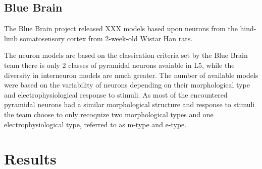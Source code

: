 \documentclass[altfont, fleqn]{uiophd}
\begin{document}
\section{Blue Brain}
The Blue Brain project released XXX models based upon neurons from 
the hind-limb somatosensory cortex
from 2-week-old Wistar Han rats.

The neuron models are based on the classication criteria set by the Blue Brain 
team there is only 2 classes of pyramidal neurons avaiable in L5, while
the diversity in interneuron models are much greater.
The number of available models were based on the variability of 
neurons depending on their morphological type and 
electrophysiological response to stimuli.
As most of the encountered pyramidal neurons had a similar morphological
structure and response to stimuli the team choose to only recoqnize
two morphological types and one electrophysiological type, 
referred to as m-type and e-type.


\chapter{Results}

\vspace{1em} 
\startcontents
{}

\end{document}

